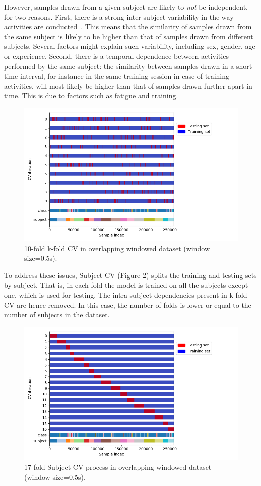 \documentclass[sigconf]{acmart}
\begin{document}
However, samples drawn from a given subject are likely to \emph{not} be independent, for two reasons. First, there is a strong inter-subject variability in the way activities are conducted~\cite{bulling2014tutorial}. This means that the similarity of samples drawn from the same subject is likely to be higher than that of samples drawn from different subjects. Several factors might explain such variability, including sex, gender, age or experience. Second, there is a temporal dependence between activities performed by the same subject: the similarity between samples drawn in a short time interval, for instance in the same training session in case of training activities, will most likely be higher than that of samples drawn further apart in time. This is due to factors such as fatigue and training.

\begin{figure}[ht]
    \centering
    \includegraphics[width=.5\textwidth]{Figures/ShuffleSplit.png}
    \caption{10-fold k-fold CV in overlapping windowed dataset (window size=0.5s).}
    \label{fig:Shuffle-cv}
\end{figure}

To address these issues, Subject CV (Figure \ref{fig:Subjective-cv}) splits the training and testing sets by subject. That is, in each fold the model is trained on all the subjects except one, which is used for testing. The intra-subject dependencies present in k-fold CV are hence removed. In this case, the number of folds is lower or equal to the number of subjects in the dataset.

\begin{figure}[h]
    \centering
    \includegraphics[width=.5\textwidth]{Figures/LeaveOneGroupOut.png}
    \caption{17-fold Subject CV process in overlapping windowed dataset (window size=0.5s).}
    \label{fig:Subjective-cv}
\end{figure}
\end{document}
